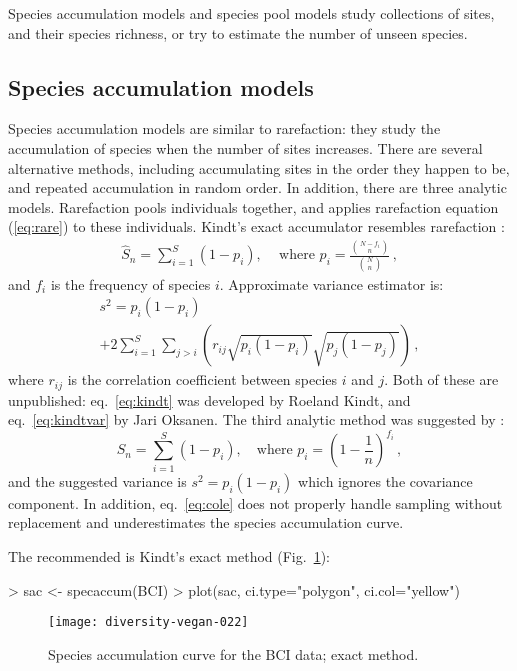 \documentclass[a4paper,10pt,twocolumn]{article}
\begin{document}
Species accumulation models and species pool models study collections
of sites, and their species richness, or try to estimate the number of
unseen species.

\subsection{Species accumulation models}

Species accumulation models are similar to rarefaction: they study the
accumulation of species when the number of sites increases.  There are
several alternative methods, including accumulating sites in the order
they happen to be, and repeated accumulation in random order.  In
addition, there are three analytic models.  Rarefaction pools
individuals together, and applies rarefaction equation (\ref{eq:rare})
to these individuals.  Kindt's exact accumulator resembles rarefaction
\citep{UglandEtal03}:
\begin{multline}
\label{eq:kindt}
\hat S_n = \sum_{i=1}^S (1 - p_i), \,\quad \text{where }
p_i = \frac{{N- f_i \choose n}}{{N \choose n}} \,,
\end{multline}
and $f_i$ is the frequency of species $i$.  Approximate variance
estimator is:
\begin{multline}
\label{eq:kindtvar}
s^2 = p_i (1 - p_i)  \\ + 2 \sum_{i=1}^S \sum_{j>i} \left( r_{ij}
  \sqrt{p_i(1-p_i)} \sqrt{p_j (1-p_j)}\right) \,,
\end{multline}
where $r_{ij}$ is the correlation coefficient between species $i$ and
$j$.  Both of these are unpublished: eq.~\ref{eq:kindt} was developed
by Roeland Kindt, and eq.~\ref{eq:kindtvar} by Jari Oksanen. The third
analytic method was suggested by \citet{Coleman82}:
\begin{equation}
\label{eq:cole}
S_n = \sum_{i=1}^S (1 - p_i), \quad \text{where }  p_i = \left(1 -
  \frac{1}{n}\right)^{f_i} \,,
\end{equation}
and the suggested variance is $s^2 = p_i (1-p_i)$ which ignores the
covariance component.  In addition, eq.~\ref{eq:cole} does not
properly handle sampling without replacement and underestimates the
species accumulation curve.

The recommended is Kindt's exact method (Fig.~\ref{fig:sac}):
\begin{Schunk}
\begin{Sinput}
> sac <- specaccum(BCI)
> plot(sac, ci.type="polygon", ci.col="yellow")
\end{Sinput}
\end{Schunk}
\begin{figure}
\texttt{[image: diversity-vegan-022]}
\caption{Species accumulation curve for the BCI data; exact method.}
\label{fig:sac}
\end{figure}
\end{document}
